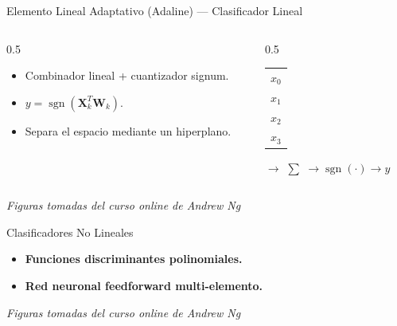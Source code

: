 \documentclass[aspectratio=169,utf8,spanish]{beamer}
\DeclareMathOperator{\sgn}{sgn}
\begin{document}
\begin{frame}{Elemento Lineal Adaptativo (Adaline) — Clasificador Lineal}
  \begin{columns}
    \begin{column}{0.5\textwidth}
      \begin{itemize}
        \item Combinador lineal + cuantizador signum.
        \item $y = \sgn(\mathbf{X}_k^T \mathbf{W}_k)$.
        \item Separa el espacio mediante un hiperplano.
      \end{itemize}
    \end{column}
    \begin{column}{0.5\textwidth}
      \begin{center}
        \begin{tabular}{c}
          $x_0$ \\
          $x_1$ \\
          $x_2$ \\
          $x_3$
        \end{tabular}
        $\to$
        $\displaystyle\sum$
        $\to \sgn(\cdot) \to y$
      \end{center}
    \end{column}
  \end{columns}

  \begin{center}
    \textit{Figuras tomadas del curso online de Andrew Ng}
  \end{center}
\end{frame}

\begin{frame}{Clasificadores No Lineales}
  \begin{itemize}
    \item \textbf{Funciones discriminantes polinomiales.}
    \item \textbf{Red neuronal feedforward multi-elemento.}
  \end{itemize}
  \begin{center}
    \textit{Figuras tomadas del curso online de Andrew Ng}
  \end{center}
\end{frame}
\end{document}

